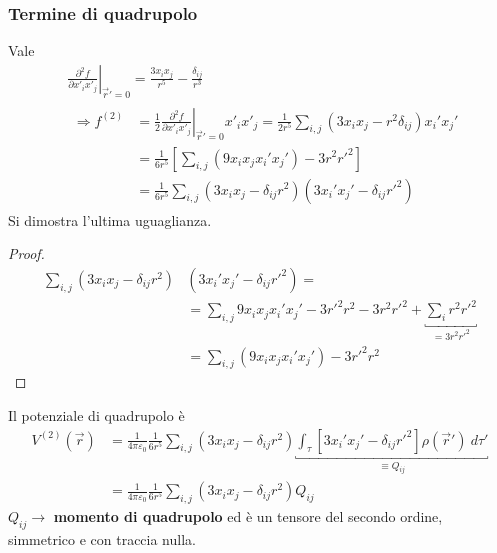\documentclass[a4paper]{scrartcl}
\newcommand*\Eval[3]{\left.#1\right\rvert_{#2}^{#3}}
\numberwithin{equation}{subsection}
\theoremstyle{style1}
\newenvironment{boxenv}[1][]{
    \begin{eqbox}[#1]
    }{
   \end{eqbox}
}
\begin{document}
\subsubsection{Termine di quadrupolo}
Vale
\begin{equation}
	\begin{split}
		&\Eval{\frac{\partial ^2f}{\partial x'_ix'_j} }{\vec{r}' =0}{} = \frac{3 x_i x_j}{r^5} - \frac{\delta _{ij} }{r^3}\\
		&\begin{split}
			\Rightarrow f^{(2)} &= \frac{1}{2}\Eval{\frac{\partial ^2f}{\partial x'_ix'_j} }{\vec{r}' =0}{} x'_i x'_j =\frac{1}{2r^5} \sum_{i,j}^{} (3x_{i} x_j - r^2 \delta _{ij} ) x_i' x_j'\\
					    &=\frac{1}{6r^5}\left[ \sum_{i,j}^{} (9x_ix_jx_i'x_j') - 3r^2r'^2 \right] \\
					    &=\frac{1}{6r^5}\sum_{i,j}^{} \left(3x_i x_j - \delta _{ij} r^2\right) \left(3x_i'x_j' - \delta _{ij} r'^2\right) 
		\end{split}
	\end{split}
\end{equation}
Si dimostra l'ultima uguaglianza.
\begin{boxenv}[]
\begin{proof}
	\begin{equation}
		\begin{split}
			\sum_{i,j}^{} \left(3x_i x_j - \delta _{ij} r^2\right) &\left(3x_i'x_j' - \delta _{ij} r'^2\right) =\\
									       &= \sum_{i,j}^{} 9x_ix_jx_i'x_j' - 3r'^2 r^2 - 3r^2 r'^2 + \underbracket{\sum_{i}^{} r^2 r'^2}_{=3r^2 r'^2} \\
			&=\sum_{i,j}^{} (9x_ix_jx_i'x_j') - 3 r'^2 r^2
		\end{split}
	\end{equation}
\end{proof}
\end{boxenv}
\noindent Il potenziale di quadrupolo \`e
\begin{equation}
	\begin{split}
		V^{(2)} (\vec{r}) &= \frac{1}{4\pi \varepsilon _0}\frac{1}{6r^5} \sum_{i,j}^{} \left(3x_ix_j - \delta _{ij} r^2\right) \underbracket{\int_{\tau } \left[ 3x_i'x_j' - \delta _{ij} r'^2 \right] \rho (\vec{r}') \ d\tau '}_{\equiv Q_{ij} } \\
				  &=\frac{1}{4\pi \varepsilon _0}\frac{1}{6r^5} \sum_{i,j}^{} \left(3x_ix_j - \delta _{ij} r^2\right)Q_{ij} 
	\end{split}
\end{equation}
$Q_{ij} \to $ \textbf{momento di quadrupolo} ed \`e un tensore del secondo ordine, simmetrico e con traccia nulla. 
\end{document}
